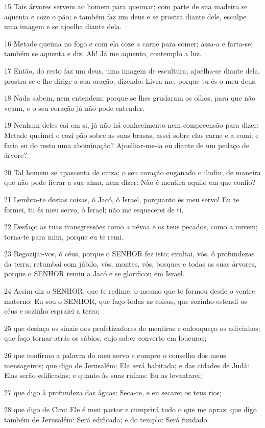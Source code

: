 \par 15 Tais árvores servem ao homem para queimar; com parte de sua madeira se aquenta e coze o pão; e também faz um deus e se prostra diante dele, esculpe uma imagem e se ajoelha diante dela.
\par 16 Metade queima no fogo e com ela coze a carne para comer; assa-a e farta-se; também se aquenta e diz: Ah! Já me aquento, contemplo a luz.
\par 17 Então, do resto faz um deus, uma imagem de escultura; ajoelha-se diante dela, prostra-se e lhe dirige a sua oração, dizendo: Livra-me, porque tu és o meu deus.
\par 18 Nada sabem, nem entendem; porque se lhes grudaram os olhos, para que não vejam, e o seu coração já não pode entender.
\par 19 Nenhum deles cai em si, já não há conhecimento nem compreensão para dizer: Metade queimei e cozi pão sobre as suas brasas, assei sobre elas carne e a comi; e faria eu do resto uma abominação? Ajoelhar-me-ia eu diante de um pedaço de árvore?
\par 20 Tal homem se apascenta de cinza; o seu coração enganado o iludiu, de maneira que não pode livrar a sua alma, nem dizer: Não é mentira aquilo em que confio?
\par 21 Lembra-te destas coisas, ó Jacó, ó Israel, porquanto és meu servo! Eu te formei, tu és meu servo, ó Israel; não me esquecerei de ti.
\par 22 Desfaço as tuas transgressões como a névoa e os teus pecados, como a nuvem; torna-te para mim, porque eu te remi.
\par 23 Regozijai-vos, ó céus, porque o SENHOR fez isto; exultai, vós, ó profundezas da terra; retumbai com júbilo, vós, montes, vós, bosques e todas as suas árvores, porque o SENHOR remiu a Jacó e se glorificou em Israel.
\par 24 Assim diz o SENHOR, que te redime, o mesmo que te formou desde o ventre materno: Eu sou o SENHOR, que faço todas as coisas, que sozinho estendi os céus e sozinho espraiei a terra;
\par 25 que desfaço os sinais dos profetizadores de mentiras e enlouqueço os adivinhos; que faço tornar atrás os sábios, cujo saber converto em loucuras;
\par 26 que confirmo a palavra do meu servo e cumpro o conselho dos meus mensageiros; que digo de Jerusalém: Ela será habitada; e das cidades de Judá: Elas serão edificadas; e quanto às suas ruínas: Eu as levantarei;
\par 27 que digo à profundeza das águas: Seca-te, e eu secarei os teus rios;
\par 28 que digo de Ciro: Ele é meu pastor e cumprirá tudo o que me apraz; que digo também de Jerusalém: Será edificada; e do templo: Será fundado.

